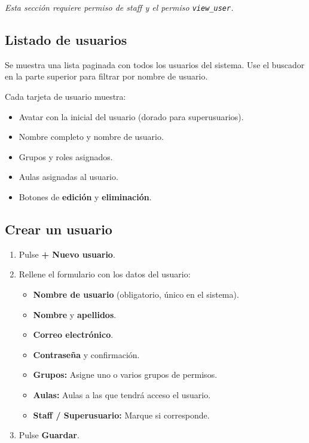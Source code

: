 \documentclass[12pt,a4paper]{article}
\begin{document}
\textit{Esta sección requiere permiso de staff y el permiso \texttt{view\_user}.}

\subsection{Listado de usuarios}

Se muestra una lista paginada con todos los usuarios del sistema. Use el buscador en la parte superior para filtrar por nombre de usuario.

Cada tarjeta de usuario muestra:
\begin{itemize}
    \item Avatar con la inicial del usuario (dorado para superusuarios).
    \item Nombre completo y nombre de usuario.
    \item Grupos y roles asignados.
    \item Aulas asignadas al usuario.
    \item Botones de \textbf{edición} y \textbf{eliminación}.
\end{itemize}

\subsection{Crear un usuario}

\begin{enumerate}
    \item Pulse \textbf{+ Nuevo usuario}.
    \item Rellene el formulario con los datos del usuario:
    \begin{itemize}
        \item \textbf{Nombre de usuario} (obligatorio, único en el sistema).
        \item \textbf{Nombre} y \textbf{apellidos}.
        \item \textbf{Correo electrónico}.
        \item \textbf{Contraseña} y confirmación.
        \item \textbf{Grupos:} Asigne uno o varios grupos de permisos.
        \item \textbf{Aulas:} Aulas a las que tendrá acceso el usuario.
        \item \textbf{Staff / Superusuario:} Marque si corresponde.
    \end{itemize}
    \item Pulse \textbf{Guardar}.
\end{enumerate}
\end{document}
